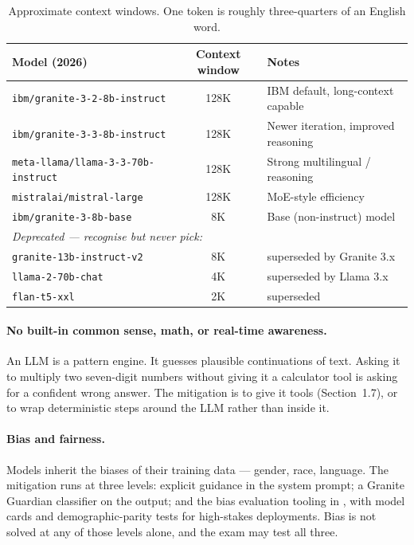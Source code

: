 \begin{table}[h]
\centering
\small
\begin{tabularx}{\textwidth}{l c X}
\toprule
\textbf{Model (2026)} & \textbf{Context window} & \textbf{Notes} \\
\midrule
\texttt{ibm/granite-3-2-8b-instruct}        & 128K & IBM default, long-context capable \\
\texttt{ibm/granite-3-3-8b-instruct}        & 128K & Newer iteration, improved reasoning \\
\texttt{meta-llama/llama-3-3-70b-instruct}  & 128K & Strong multilingual / reasoning \\
\texttt{mistralai/mistral-large}            & 128K & MoE-style efficiency \\
\texttt{ibm/granite-3-8b-base}              & 8K   & Base (non-instruct) model \\
\midrule
\multicolumn{3}{l}{\textit{Deprecated --- recognise but never pick:}} \\
\texttt{granite-13b-instruct-v2}            & 8K & superseded by Granite 3.x \\
\texttt{llama-2-70b-chat}                   & 4K & superseded by Llama 3.x \\
\texttt{flan-t5-xxl}                        & 2K & superseded \\
\bottomrule
\end{tabularx}
\caption{Approximate context windows. One token is roughly three-quarters of an English word.}
\label{tab:context-windows}
\end{table}

\paragraph{No built-in common sense, math, or real-time awareness.} An LLM is a pattern engine. It guesses plausible continuations of text. Asking it to multiply two seven-digit numbers without giving it a calculator tool is asking for a confident wrong answer. The mitigation is to give it tools (Section~1.7), or to wrap deterministic steps around the LLM rather than inside it.

\paragraph{Bias and fairness.} Models inherit the biases of their training data --- gender, race, language. The mitigation runs at three levels: explicit guidance in the system prompt; a Granite Guardian classifier on the output; and the bias evaluation tooling in , with model cards and demographic-parity tests for high-stakes deployments. Bias is not solved at any of those levels alone, and the exam may test all three.

